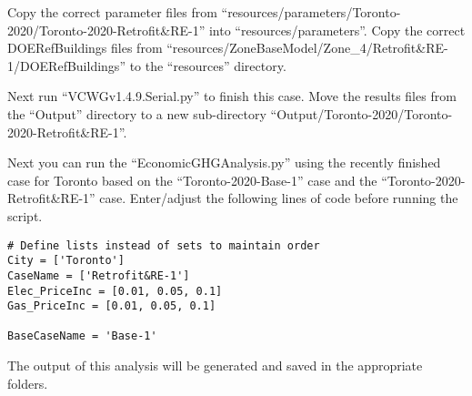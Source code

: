 \documentclass[12pt]{article}
\begin{document}
Copy the correct parameter files from ``resources/parameters/Toronto-2020/Toronto-2020-Retrofit\&RE-1'' into ``resources/parameters''. Copy the correct DOERefBuildings files from ``resources/ZoneBaseModel/Zone\_4/Retrofit\&RE-1/DOERefBuildings'' to the ``resources'' directory.


Next run ``VCWGv1.4.9.Serial.py'' to finish this case. Move the results files from the ``Output'' directory to a new sub-directory ``Output/Toronto-2020/Toronto-2020-Retrofit\&RE-1''.

Next you can run the ``EconomicGHGAnalysis.py'' using the recently finished case for Toronto based on the ``Toronto-2020-Base-1'' case and the ``Toronto-2020-Retrofit\&RE-1'' case. Enter/adjust the following lines of code before running the script. 

\begin{verbatim}
# Define lists instead of sets to maintain order
City = ['Toronto']
CaseName = ['Retrofit&RE-1']
Elec_PriceInc = [0.01, 0.05, 0.1]
Gas_PriceInc = [0.01, 0.05, 0.1]

BaseCaseName = 'Base-1'
\end{verbatim}

The output of this analysis will be generated and saved in the appropriate folders.



\end{document}
